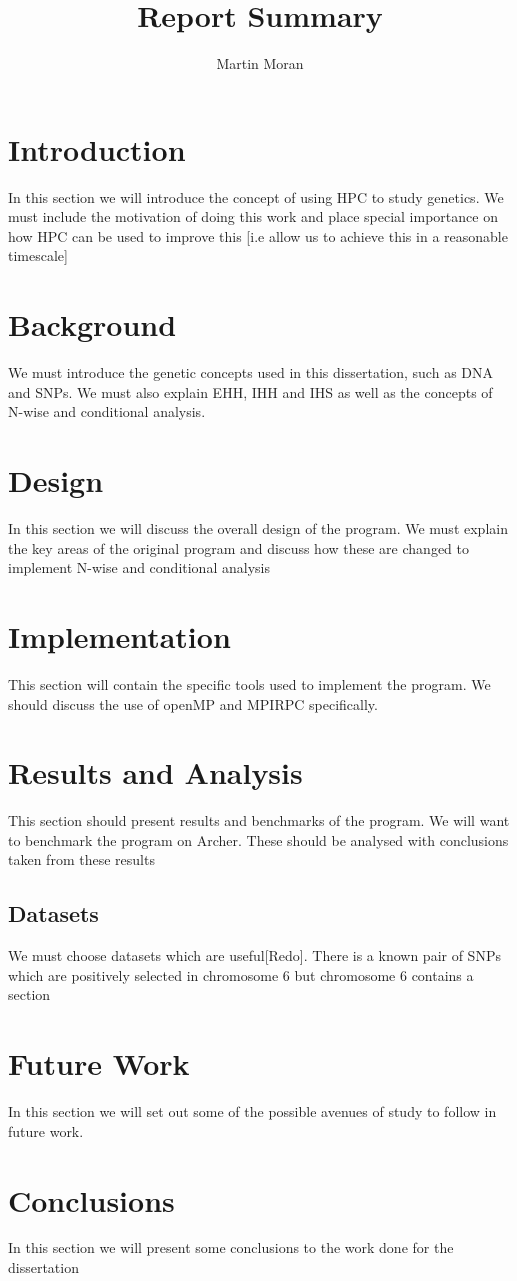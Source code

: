 \documentclass[a4paper,12pt]{article}
\begin{document}
\title{Report Summary}
\author{Martin Moran}
\maketitle

\section{Introduction}
In this section we will introduce the concept of using HPC to study genetics. We must include the motivation of doing this work and place special importance on how HPC can be used to improve this [i.e allow us to achieve this in a reasonable timescale]

\section{Background}
We must introduce the genetic concepts used in this dissertation, such as DNA and SNPs. We must also explain EHH, IHH and IHS as well as the concepts of N-wise and conditional analysis.

\section{Design}
In this section we will discuss the overall design of the program. We must explain the key areas of the original program and discuss how these are changed to implement N-wise and conditional analysis

\section{Implementation}
This section will contain the specific tools used to implement the program. We should discuss the use of openMP and MPIRPC specifically.

\section{Results and Analysis}
This section should present results and benchmarks of the program. We will want to benchmark the program on Archer. These should be analysed with conclusions taken from  these results

\subsection{Datasets}
We must choose datasets which are useful[Redo]. There is a known pair of SNPs which are positively selected in chromosome 6 but chromosome 6 contains a section

\section{Future Work}
In this section we will set out some of the possible avenues of study to follow in future work.

\section{Conclusions}
In this section we will present some conclusions to the work done for the dissertation
\end{document}
